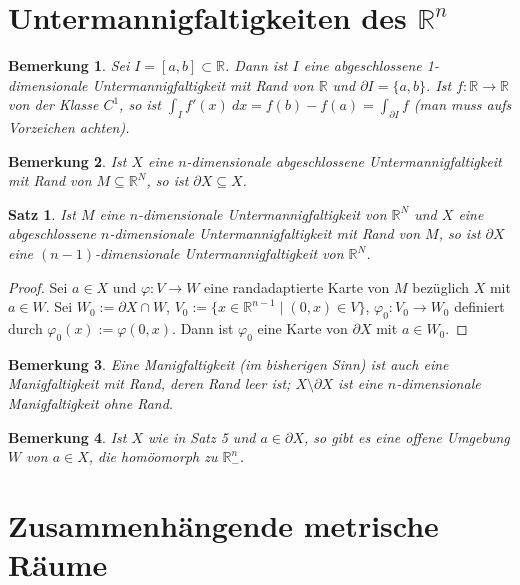 \documentclass[10pt,a4paper]{report}
\newtheorem{satz}{Satz}
\newtheorem*{remark}{Bemerkung}
\begin{document}
\section{Untermannigfaltigkeiten des $\mathbb{R}^{n}$}

\begin{remark}
  Sei $I = [a, b] \subset \mathbb{R}$.
  Dann ist $I$ eine abgeschlossene 1-dimensionale Untermannigfaltigkeit mit Rand von $\mathbb{R}$ und $\partial I = \{ a, b \}$.
  Ist $f : \mathbb{R} \rightarrow \mathbb{R}$ von der Klasse $C^{1}$, so ist $\int_{I} f'(x)\ dx = f(b) - f(a) = \int_{\partial I} f$ (man muss aufs Vorzeichen achten).
\end{remark}

\begin{remark}
  Ist $X$ eine $n$-dimensionale abgeschlossene Untermannigfaltigkeit mit Rand von $M \subseteq \mathbb{R}^{N}$, so ist $\partial X \subseteq X$.
\end{remark}

\begin{satz}
  Ist $M$ eine $n$-dimensionale Untermannigfaltigkeit von $\mathbb{R}^{N}$ und $X$ eine abgeschlossene $n$-dimensionale Untermannigfaltigkeit mit Rand von $M$, so ist $\partial X$ eine $(n - 1)$-dimensionale Untermannigfaltigkeit von $\mathbb{R}^{N}$.
\end{satz}

\begin{proof}
  Sei $a \in X$ und $\varphi : V \rightarrow W$ eine randadaptierte Karte von $M$ bezüglich $X$ mit $a \in W$.
  Sei $W_{0} := \partial X \cap W$, $V_{0} := \{ x \in \mathbb{R}^{n - 1} \mid (0, x) \in V \}$, $\varphi_{0} : V_{0} \rightarrow W_{0}$ definiert durch $\varphi_{0}(x) := \varphi(0, x)$.
  Dann ist $\varphi_{0}$ eine Karte von $\partial X$ mit $a \in W_{0}$.
\end{proof}

\begin{remark}
  Eine Manigfaltigkeit (im bisherigen Sinn) ist auch eine Manigfaltigkeit mit Rand, deren Rand leer ist; $X \setminus \partial X$ ist eine $n$-dimensionale Manigfaltigkeit ohne Rand.
\end{remark}

\begin{remark}
  Ist $X$ wie in Satz 5 und $a \in \partial X$, so gibt es eine offene Umgebung $W$ von $a \in X$, die homöomorph zu $\mathbb{R}_{-}^{n}$.
\end{remark}

\section{Zusammenhängende metrische Räume}
\end{document}

